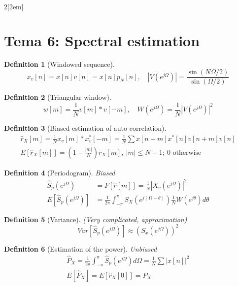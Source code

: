 \documentclass[leqno]{article}
\newtheorem*{definition}{Definition}
\begin{document}
\begin{multicols}{2}[\columnsep2em]
\section{Tema 6: Spectral estimation}
\begin{definition}[Windowed sequence] 
  \[
  x_v[n]=x[n]v[n]=x[n]p_N[n], \quad |V(e^{j\Omega})|=\frac{\sin(N\Omega / 2)}{\sin(\Omega  / 2)}
  \] 
\end{definition}

\begin{definition}[Triangular window] 
  \[
    w[m]=\frac{1}{N}v[m]*v[-m] , \quad W(e^{j\Omega})=\frac{1}{N}\left|V(e^{j\Omega})\right|^2 
  \] 
\end{definition}

\begin{definition}[Biased estimation of auto-correlation]
  \begin{align*}
  \hat{r}_X[m] = \frac{1}{N} x_v[m]\ast x_v^*[-m] = \frac{1}{N}\sum x[n+m]x^*[n]v[n+m]v[n]\\
  E[\hat{r}_X[m]] = \left( 1-\frac{|m|}{N} \right) r_X[m],\ |m|\le N-1; \ 0 \text{ otherwise} 
  \end{align*}
\end{definition}



\begin{definition}[Periodogram] Biased
  \begin{align*}
	\hat{S}_p(e^{j\Omega })&=F[\hat{r}[m]]=\frac{1}{N}|X_v(e^{j\Omega })|^2 \\
	E[\hat{S}_p(e^{j\Omega })] &= \frac{1}{2\pi}\int_{-\pi}^{\pi}S_X(e^{j(\Omega-\theta )})\frac{1}{N}W(e^{j\theta })d\theta 
  \end{align*}
\end{definition}

\begin{definition}[Variance] (Very complicated, approximation)
\[
Var[\hat{S}_p(e^{j\Omega})]\approx (S_x(e^{j\Omega}))^2
\] 
\end{definition}

\begin{definition}[Estimation of the power] Unbiased
  \begin{align*}
    \hat{P}_X = \frac{1}{2\pi}\int_{-\pi}^{\pi} \hat{S}_p(e^{j\Omega})d\Omega = \frac{1}{N}\sum|x[n]|^2 \\
	E[\hat{P}_{X}] = E[\hat{r}_X[0]]=P_X
  \end{align*}
\end{definition}


\end{multicols}
\end{document}
